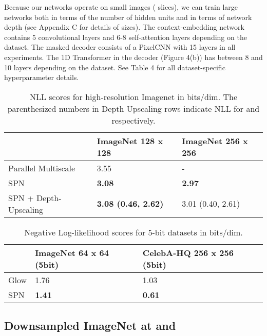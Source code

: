 \documentclass{article} \usepackage{iclr2019_conference,times}
\begin{document}
Because our networks operate on small images ( slices), we can train large networks both in terms of the number of hidden units and in terms of network depth (see Appendix C for details of sizes).
The context-embedding network contains 5 convolutional layers and 6-8 self-attention layers depending on the dataset. The masked decoder consists of a PixelCNN with 15 layers in all experiments. The 1D Transformer in the decoder (Figure 4(b)) has between 8 and 10 layers depending on the dataset. See Table 4 for all dataset-specific hyperparameter details.

\begin{table}[t]
\small
\begin{center}
\begin{tabular}{l|l|l}
 & ImageNet 128 x 128 & ImageNet 256 x 256 \\
\hline
\hline
Parallel Multiscale \citep{ParallelMultiscale}  & 3.55 &- \\
\hline
\hline
SPN & \bf{3.08} & \bf{2.97} \\
SPN + Depth-Upscaling & \bf{3.08} (0.46, 2.62) & 3.01 (0.40, 2.61) \\
\end{tabular}
\caption{NLL scores for high-resolution Imagenet in bits/dim. The parenthesized numbers in Depth Upscaling rows indicate NLL for  and  respectively.}
\end{center}
\label{tab:imagenet}
\end{table}



\begin{table}[t]
\small
\begin{center}
\begin{tabular}{l|l|l}
& ImageNet 64 x 64 (5bit) & CelebA-HQ 256 x 256 (5bit) \\
\hline
\hline
Glow \citep{Glow}  & 1.76 & 1.03 \\
\hline
\hline
SPN & \bf{1.41} & \bf{0.61} \\
\end{tabular}
\caption{Negative Log-likelihood scores for 5-bit datasets in bits/dim.}
\end{center}
\vspace{-0.3cm}
\label{tab:fivebit}
\end{table}

\subsection{Downsampled ImageNet at  and }
\end{document}
